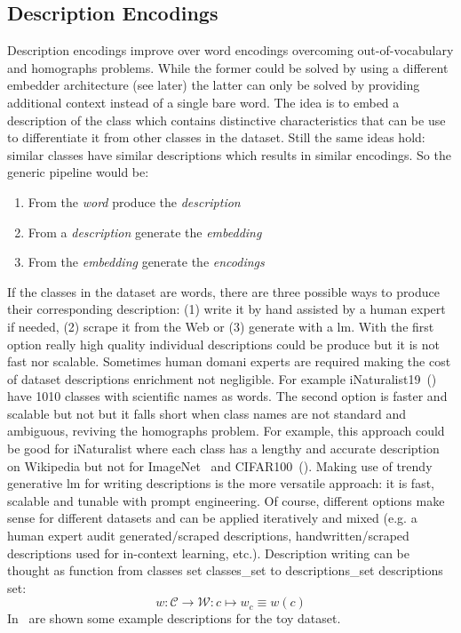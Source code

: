 \subsection{Description Encodings}
\label{subsec:description-encodings}

Description encodings improve over word encodings overcoming out-of-vocabulary and homographs problems. While the former could be solved by using a different embedder architecture (see later) the latter can only be solved by providing additional context instead of a single bare word. 
The idea is to embed a description of the class which contains distinctive characteristics that can be use to differentiate it from other classes in the dataset. Still the same ideas hold: similar classes have similar descriptions which results in similar encodings.
So the generic pipeline would be:
\begin{enumerate}
  \item From the \emph{word} produce the \emph{description}
  \item From a \emph{description} generate the \emph{embedding}
  \item From the \emph{embedding} generate the \emph{encodings}
\end{enumerate}

If the classes in the dataset are words, there are three possible ways to produce their corresponding description: (1) write it by hand assisted by a human expert if needed, (2) scrape it from the Web or (3) generate with a \acrshort{lm}.
With the first option really high quality individual descriptions could be produce but it is not fast nor scalable. Sometimes human domani experts are required making the cost of dataset descriptions enrichment not negligible. For example iNaturalist19~() have 1010 classes with scientific names as words.
The second option is faster and scalable but not but it falls short when class names are not standard and ambiguous, reviving the homographs problem. For example, this approach could be good for iNaturalist where each class has a lengthy and accurate description on Wikipedia but not for ImageNet~\cite{ImagenetALarDeng2009} and CIFAR100~().
Making use of trendy generative \acrshort{lm} for writing descriptions is the more versatile approach: it is fast, scalable and tunable with prompt engineering.
Of course, different options make sense for different datasets and can be applied iteratively and mixed (e.g. a human expert audit generated/scraped descriptions, handwritten/scraped descriptions used for in-context learning, etc.).
Description writing can be thought as function from classes set \gls{classes_set} to \gls{descriptions_set} descriptions set:
\begin{equation}
  w : \mathcal{C} \to \mathcal{W}:
  c \mapsto w_c \equiv w(c)
  \label{eq:desc-writing}
\end{equation}
In~ are shown some example descriptions for the toy dataset.

